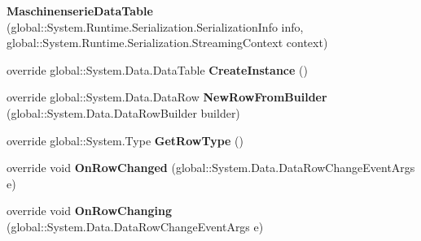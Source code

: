 \begin{DoxyCompactItemize}
\item 
{\bfseries Maschinenserie\+Data\+Table} (global\+::\+System.\+Runtime.\+Serialization.\+Serialization\+Info info, global\+::\+System.\+Runtime.\+Serialization.\+Streaming\+Context context)\hypertarget{class_products_1_1_data_1_1ds_sage_1_1_maschinenserie_data_table_a0288c995d4c4b0479aaf848c97cfb7d2}{}\label{class_products_1_1_data_1_1ds_sage_1_1_maschinenserie_data_table_a0288c995d4c4b0479aaf848c97cfb7d2}

\item 
override global\+::\+System.\+Data.\+Data\+Table {\bfseries Create\+Instance} ()\hypertarget{class_products_1_1_data_1_1ds_sage_1_1_maschinenserie_data_table_a056dfe39a53a636e3117a35fc10fc4d0}{}\label{class_products_1_1_data_1_1ds_sage_1_1_maschinenserie_data_table_a056dfe39a53a636e3117a35fc10fc4d0}

\item 
override global\+::\+System.\+Data.\+Data\+Row {\bfseries New\+Row\+From\+Builder} (global\+::\+System.\+Data.\+Data\+Row\+Builder builder)\hypertarget{class_products_1_1_data_1_1ds_sage_1_1_maschinenserie_data_table_a1d5ebd7007fc289a863669901ca1662c}{}\label{class_products_1_1_data_1_1ds_sage_1_1_maschinenserie_data_table_a1d5ebd7007fc289a863669901ca1662c}

\item 
override global\+::\+System.\+Type {\bfseries Get\+Row\+Type} ()\hypertarget{class_products_1_1_data_1_1ds_sage_1_1_maschinenserie_data_table_a4929e9d475d8ca3b4bd450c12b96fbe1}{}\label{class_products_1_1_data_1_1ds_sage_1_1_maschinenserie_data_table_a4929e9d475d8ca3b4bd450c12b96fbe1}

\item 
override void {\bfseries On\+Row\+Changed} (global\+::\+System.\+Data.\+Data\+Row\+Change\+Event\+Args e)\hypertarget{class_products_1_1_data_1_1ds_sage_1_1_maschinenserie_data_table_a35e6726a4bc4b9af8caed04ad79120fc}{}\label{class_products_1_1_data_1_1ds_sage_1_1_maschinenserie_data_table_a35e6726a4bc4b9af8caed04ad79120fc}

\item 
override void {\bfseries On\+Row\+Changing} (global\+::\+System.\+Data.\+Data\+Row\+Change\+Event\+Args e)\hypertarget{class_products_1_1_data_1_1ds_sage_1_1_maschinenserie_data_table_a15674987ceaf71544cb809ba966c30e7}{}\label{class_products_1_1_data_1_1ds_sage_1_1_maschinenserie_data_table_a15674987ceaf71544cb809ba966c30e7}


\end{DoxyCompactItemize}
